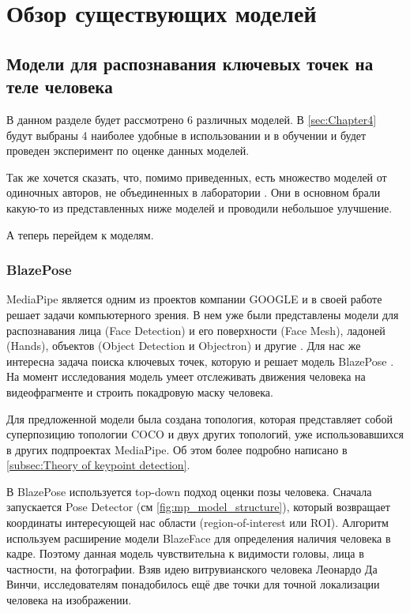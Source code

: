 \section{Обзор существующих моделей}
\label{sec:Chapter2} 

\subsection{Модели для распознавания ключевых точек на теле человека}
\label{subsec:pose_estimation_models}

В данном разделе будет рассмотрено 6 различных моделей. В \autoref{sec:Chapter4} будут выбраны 4 наиболее удобные в использовании и в обучении и будет проведен эксперимент по оценке данных моделей.

Так же хочется сказать, что, помимо приведенных, есть множество моделей от одиночных авторов, не объединенных в лаборатории \cite{pet_recognition, pet_classification}. Они в основном брали какую-то из представленных ниже моделей и проводили небольшое улучшение.

А теперь перейдем к моделям.

\subsubsection{BlazePose}
\label{subsubsec:blazepose_desc}

MediaPipe является одним из проектов компании GOOGLE и в своей работе решает задачи компьютерного зрения. В нем уже были представлены модели для распознавания лица (Face Detection) и его поверхности (Face Mesh), ладоней (Hands), объектов (Object Detection и Objectron) и другие \cite{mediapipe}. Для нас же интересна задача поиска ключевых точек, которую и решает модель BlazePose \cite{BlazePose}. На момент исследования модель умеет отслеживать движения человека на видеофрагменте и строить покадровую маску человека.

Для предложенной модели была создана топология, которая представляет собой суперпозицию топологии COCO и двух других топологий, уже использовавшихся в других подпроектах MediaPipe. Об этом более подробно написано в \autoref{subsec:Theory of keypoint detection}.

\hfill \break
В BlazePose используется top-down подход оценки позы человека. Сначала запускается Pose Detector (см \autoref{fig:mp_model_structure}), который возвращает координаты интересующей нас области (region-of-interest или ROI). Алгоритм используем расширение модели BlazeFace для определения наличия человека в кадре. Поэтому данная модель чувствительна к видимости головы, лица в частности, на фотографии. Взяв идею витрувианского человека Леонардо Да Винчи, исследователям понадобилось ещё две точки для точной локализации человека на изображении.


